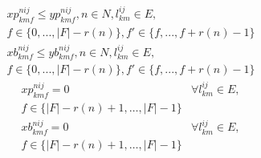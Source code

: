 \documentclass[a4j,twocolumn,fleqn]{jarticle}
\begin{document}
\begin{eqnarray}%
xp^{nij}_{kmf} \leq yp^{nij}_{kmf}, n \in N, l^{ij}_{km} \in E, \\
f \in \{0, ... , |F|-r(n)\},f' \in \{f, ... ,f + r(n)-1\}\nonumber
\end{eqnarray}%
\begin{eqnarray}%
xb^{nij}_{kmf} \leq yb^{nij}_{kmf}, n \in N, l^{ij}_{km} \in E, \\
f \in \{0, ... , |F|-r(n)\},f' \in \{f, ... ,f + r(n)-1\}\nonumber
\end{eqnarray}%
\begin{eqnarray}%
xp^{nij}_{kmf} = 0 & \forall l^{ij}_{km} \in E, \\
f \in \{|F| - r(n)+1, \dots ,|F|-1\}\nonumber
\end{eqnarray}%
\begin{eqnarray}%
xb^{nij}_{kmf} = 0 & \forall l^{ij}_{km} \in E, \\
f \in \{|F| - r(n)+1, \dots ,|F|-1\}\nonumber
\end{eqnarray}%
\end{document}
